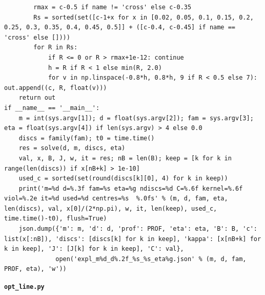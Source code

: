 \documentclass[11pt,reqno]{amsart}
\numberwithin{equation}{section}
\theoremstyle{definition}
\theoremstyle{remark}
\newcommand{\appsub}[1]{\par\medskip\noindent\textbf{#1}\par\nobreak\smallskip}
\begin{document}
\begin{lstlisting}
        rmax = c-0.5 if name != 'cross' else c-0.35
        Rs = sorted(set([c-1+x for x in [0.02, 0.05, 0.1, 0.15, 0.2, 0.25, 0.3, 0.35, 0.4, 0.45, 0.5]] + ([c-0.4, c-0.45] if name == 'cross' else [])))
        for R in Rs:
            if R <= 0 or R > rmax+1e-12: continue
            h = R if R < 1 else min(R, 2.0)
            for v in np.linspace(-0.8*h, 0.8*h, 9 if R < 0.5 else 7): out.append((c, R, float(v)))
    return out
if __name__ == '__main__':
    m = int(sys.argv[1]); d = float(sys.argv[2]); fam = sys.argv[3]; eta = float(sys.argv[4]) if len(sys.argv) > 4 else 0.0
    discs = family(fam); t0 = time.time()
    res = solve(d, m, discs, eta)
    val, x, B, J, w, it = res; nB = len(B); keep = [k for k in range(len(discs)) if x[nB+k] > 1e-10]
    used_c = sorted(set(round(discs[k][0], 4) for k in keep))
    print('m=%d d=%.3f fam=%s eta=%g ndiscs=%d C=%.6f kernel=%.6f viol=%.2e it=%d used=%d centres=%s  %.0fs' % (m, d, fam, eta, len(discs), val, x[0]/(2*np.pi), w, it, len(keep), used_c, time.time()-t0), flush=True)
    json.dump({'m': m, 'd': d, 'prof': PROF, 'eta': eta, 'B': B, 'c': list(x[:nB]), 'discs': [discs[k] for k in keep], 'kappa': [x[nB+k] for k in keep], 'J': [J[k] for k in keep], 'C': val},
              open('expl_m%d_d%.2f_%s_%s_eta%g.json' % (m, d, fam, PROF, eta), 'w'))
\end{lstlisting}
\appsub{\texttt{opt\_line.py}}
\end{document}
